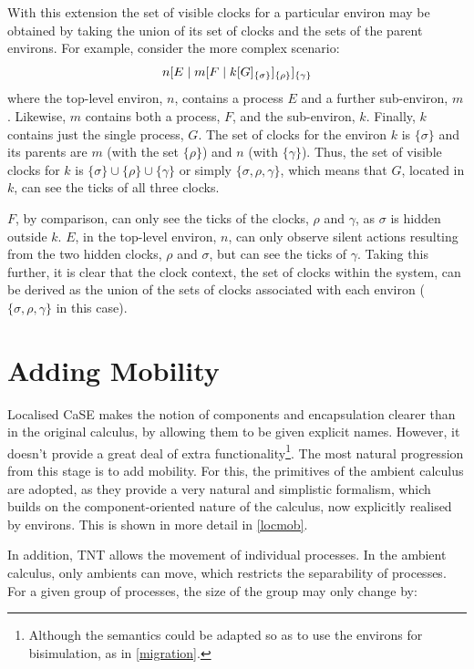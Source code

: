 With this extension the set of visible clocks for a particular environ
may be obtained by taking the union of its set of clocks and the sets of
the parent environs.  For example, consider the more complex scenario:
\begin{equation}
{n}[ E\;|\;{m}[ F\;|\;{k}[ G ]_{\{\sigma\}} ]_{\{\rho\}} ]_{\{\gamma\}}
\end{equation}
where the top-level environ, $n$, contains a process $E$ and
a further sub-environ, $m$.  Likewise, $m$ contains both a process,
$F$, and the sub-environ, $k$.  Finally, $k$ contains just the single
process, $G$.  The set of clocks for the environ $k$ is $\{\sigma\}$
and its parents are $m$ (with the set $\{\rho\}$) and $n$ (with
$\{\gamma\}$).  Thus, the set of visible clocks for $k$ is $\{\sigma\}
\cup \{\rho\} \cup \{\gamma\}$ or simply $\{\sigma, \rho, \gamma\}$,
which means that $G$, located in $k$, can see the ticks of all three
clocks.

$F$, by comparison, can only see the ticks of the clocks, $\rho$ and
$\gamma$, as $\sigma$ is hidden outside $k$.  $E$, in the top-level
environ, $n$, can only observe silent actions resulting from the two
hidden clocks, $\rho$ and $\sigma$, but can see the ticks of $\gamma$.
Taking this further, it is clear that the clock context, the set of
clocks within the system, can be derived as the union of the sets of
clocks associated with each environ ($\{\sigma, \rho, \gamma\}$ in
this case).

\section{Adding Mobility}
\label{addingmob}

Localised CaSE makes the notion of components and encapsulation clearer
than in the original calculus, by allowing them to be given explicit
names.  However, it doesn't provide a great deal of extra
functionality\footnote{Although the semantics could be adapted so as to
use the environs for bisimulation, as in \ref{migration}.}.  The most
natural progression from this stage is to add mobility.  For this, the
primitives of the ambient calculus are adopted, as they provide a very
natural and simplistic formalism, which builds on the component-oriented
nature of the calculus, now explicitly realised by environs.  This is
shown in more detail in \ref{locmob}.

In addition, TNT allows the movement of individual processes.  In the
ambient calculus, only ambients can move, which restricts the
separability of processes.  For a given group of processes, the
size of the group may only change by:

